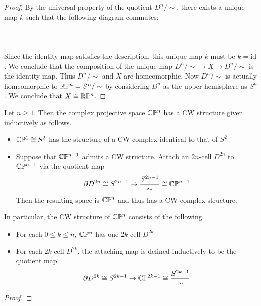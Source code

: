 \documentclass[a4paper]{article}
\begin{document}
\begin{prp}{}{}
\begin{proof}
By the universal property of the quotient $D^n/\sim$, there exists a unique map $k$ such that the following diagram commutes: \\~\\
\\~\\
Since the identity map satisfies the description, this unique map $k$ must be $k=\text{id}$. We conclude that the composition of the unique map $D^n/\sim\to X\to D^n/\sim$ is the identity map. Thus $D^n/\sim$ and $X$ are homeomorphic. Now $D^n/\sim$ is actually homeomorphic to $\mathbb{R}\mathbb{P}^n=S^n/\sim$ by considering $D^n$ as the upper hemisphere as $S^n$. We conclude that $X\cong\mathbb{R}\mathbb{P}^n$. 
\end{proof}
\end{prp}

\begin{prp}{}{} Let $n\geq 1$. Then the complex projective space $\mathbb{C}\mathbb{P}^n$ has a CW structure given inductively as follows. 
\begin{itemize}
\item $\mathbb{C}\mathbb{P}^1\cong S^2$ has the structure of a CW complex identical to that of $S^2$
\item Suppose that $\mathbb{C}\mathbb{P}^{n-1}$ admits a CW structure. Attach an $2n$-cell $D^{2n}$ to $\mathbb{C}\mathbb{P}^{n-1}$ via the quotient map $$\partial D^{2n}\cong S^{2n-1}\to\frac{S^{2n-1}}{\sim}\cong\mathbb{C}\mathbb{P}^{n-1}$$ Then the resulting space is $\mathbb{C}\mathbb{P}^n$ and thus has a CW complex structure. 
\end{itemize}
In particular, the CW structure of $\mathbb{C}\mathbb{P}^n$ consists of the following. 
\begin{itemize}
\item For each $0\leq k\leq n$, $\mathbb{C}\mathbb{P}^n$ has one $2k$-cell $D^{2k}$
\item For each $2k$-cell $D^{2k}$, the attaching map is defined inductively to be the quotient map $$\partial D^{2k}\cong S^{2k-1}\to\mathbb{C}\mathbb{P}^{2k-1}\cong\frac{S^{2k-1}}{\sim}$$
\end{itemize} \tcbline
\begin{proof}

\end{proof}
\end{prp}
\end{document}
